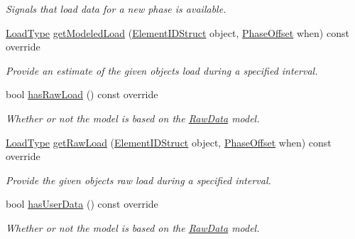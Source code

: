 \begin{DoxyCompactItemize}
\begin{DoxyCompactList}\small\item\em Signals that load data for a new phase is available. \end{DoxyCompactList}\item 
\hyperlink{namespacevt_a8fb51741340b87d7aaee0bef60e9896b}{Load\+Type} \hyperlink{structvt_1_1vrt_1_1collection_1_1balance_1_1_per_collection_ad790d560d64515d28c6914f26fbe177c}{get\+Modeled\+Load} (\hyperlink{namespacevt_1_1vrt_1_1collection_1_1balance_a9f5b53fafb270212279a4757d2c4cd28}{Element\+I\+D\+Struct} object, \hyperlink{structvt_1_1vrt_1_1collection_1_1balance_1_1_phase_offset}{Phase\+Offset} when) const override
\begin{DoxyCompactList}\small\item\em Provide an estimate of the given object\textquotesingle{}s load during a specified interval. \end{DoxyCompactList}\item 
bool \hyperlink{structvt_1_1vrt_1_1collection_1_1balance_1_1_per_collection_a82a94bbf8764a3c6bd346e4a686e1efb}{has\+Raw\+Load} () const override
\begin{DoxyCompactList}\small\item\em Whether or not the model is based on the \hyperlink{structvt_1_1vrt_1_1collection_1_1balance_1_1_raw_data}{Raw\+Data} model. \end{DoxyCompactList}\item 
\hyperlink{namespacevt_a8fb51741340b87d7aaee0bef60e9896b}{Load\+Type} \hyperlink{structvt_1_1vrt_1_1collection_1_1balance_1_1_per_collection_aed857aa2da3e7dc339236a1953b9747a}{get\+Raw\+Load} (\hyperlink{namespacevt_1_1vrt_1_1collection_1_1balance_a9f5b53fafb270212279a4757d2c4cd28}{Element\+I\+D\+Struct} object, \hyperlink{structvt_1_1vrt_1_1collection_1_1balance_1_1_phase_offset}{Phase\+Offset} when) const override
\begin{DoxyCompactList}\small\item\em Provide the given object\textquotesingle{}s raw load during a specified interval. \end{DoxyCompactList}\item 
bool \hyperlink{structvt_1_1vrt_1_1collection_1_1balance_1_1_per_collection_a9b40a4b1370e174fc18df75c5256dbd2}{has\+User\+Data} () const override
\begin{DoxyCompactList}\small\item\em Whether or not the model is based on the \hyperlink{structvt_1_1vrt_1_1collection_1_1balance_1_1_raw_data}{Raw\+Data} model. \end{DoxyCompactList}\item 

\end{DoxyCompactItemize}

